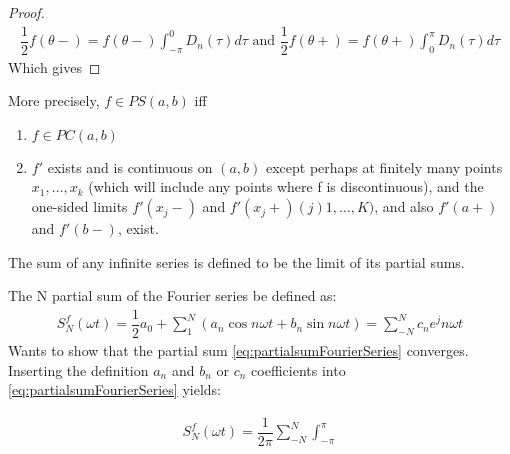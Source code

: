 \begin{proof}
	\begin{align*}
	\dfrac{1}{2} f(\theta-) = f(\theta-) \int_{-\pi}^0 D_n(\tau)d\tau \text{ and } \dfrac{1}{2}f(\theta+) = f(\theta+) \int_0^\pi D_n (\tau)d\tau
	\end{align*}
	Which gives
\end{proof}
More precisely, $f\in PS(a,b)$ iff 
\begin{enumerate}
	\item $f \in PC(a,b)$
	\item $f'$ exists and is continuous on $(a,b)$ except perhaps at finitely many points $x_1,\dots,x_k$ (which will include any points where f is discontinuous), and the one-sided limits $f'(x_j-)$ and $f'(x_j+)(j)1,\dots,K)$, and also $f'(a+)$ and $f'(b-)$, exist.
\end{enumerate}

The sum of any infinite series is defined to be the limit of its partial sums.

The N partial sum of the Fourier series be defined as:
\begin{align}\label{eq:partialsumFourierSeries}
	S_N^f(\omega t) = \dfrac{1}{2} a_0 + \sum_1^N\left(a_n \cos n\omega t + b_n \sin n \omega t \right) = \sum_{-N}^N c_n e^jn\omega t
\end{align}
Wants to show that the partial sum \eqref{eq:partialsumFourierSeries} converges.
Inserting the definition $a_n$ and $b_n$ or $c_n$ coefficients into \eqref{eq:partialsumFourierSeries} yields:

\begin{align*}
	S_N^f(\omega t) = \dfrac{1}{2\pi} \sum_{-N}^N \int_{-\pi}^\pi 
\end{align*}

